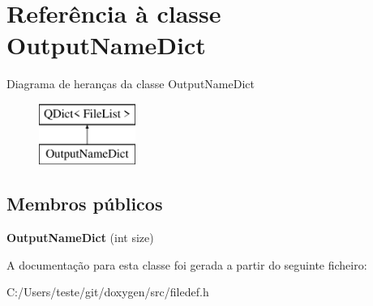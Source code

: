 \hypertarget{class_output_name_dict}{\section{Referência à classe Output\-Name\-Dict}
\label{class_output_name_dict}
}
Diagrama de heranças da classe Output\-Name\-Dict\begin{figure}[H]
\begin{center}
\leavevmode
\includegraphics[height=2.000000cm]{class_output_name_dict}
\end{center}
\end{figure}
\subsection*{Membros públicos}
\begin{DoxyCompactItemize}
\item 
\hypertarget{class_output_name_dict_adbfc110673c25352d40f10f52f721a70}{{\bfseries Output\-Name\-Dict} (int size)}\label{class_output_name_dict_adbfc110673c25352d40f10f52f721a70}

\end{DoxyCompactItemize}


A documentação para esta classe foi gerada a partir do seguinte ficheiro\-:\begin{DoxyCompactItemize}
\item 
C\-:/\-Users/teste/git/doxygen/src/filedef.\-h\end{DoxyCompactItemize}
